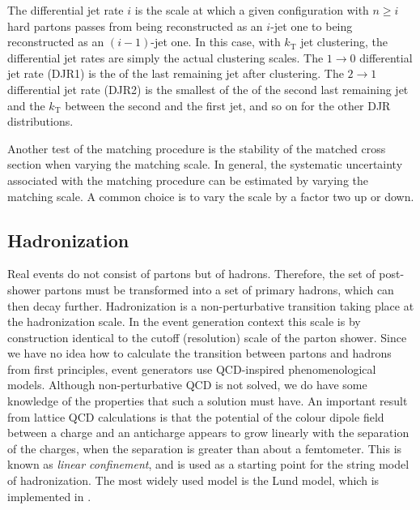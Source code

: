 The differential jet rate $i$ is the scale at which a given configuration with $n\geq i$ hard
partons passes from being reconstructed as an $i$-jet one to being reconstructed as an $(i − 1)$-jet
one. 
In this case, with $k_\mathrm{T}$ jet clustering, the differential jet rates are simply the actual
clustering scales. The $1\rightarrow 0$ differential jet rate (DJR1) is the \pt of the last
remaining jet after clustering. The $2\rightarrow 1$ differential jet rate (DJR2) is the smallest of
the \pt of the second last remaining jet and the $k_\mathrm{T}$ between the second and the first
jet, and so on for the other DJR distributions.

Another test of the matching procedure is the stability of the matched cross section when varying
the matching scale. In general, the systematic uncertainty associated with the matching procedure
can be estimated by varying the matching scale. A common choice is to vary the scale by a factor two
up or down. 


\subsection{Hadronization \label{sec:event_hadronization}}

Real events do not consist of partons but of hadrons. Therefore, the set of post-shower partons
must be transformed into a set of primary hadrons, which can then decay further. 
Hadronization is a non-perturbative transition taking place at the hadronization scale. In the
event generation context this scale is by construction identical to the cutoff (resolution) scale of
the parton shower.
Since we have no idea how to calculate the transition between partons and hadrons from first
principles, event generators use QCD-inspired phenomenological models.
Although non-perturbative QCD is not solved, we do have some knowledge of the properties
that such a solution must have. 
An important result from lattice QCD calculations is that the potential of the colour dipole field
between a charge and an anticharge appears to grow linearly with the separation of the charges, when
the separation is greater than about a femtometer. This is known as \textit{linear confinement}, and
is used as a starting point for the string model of hadronization.
The most widely used model is the Lund model, which is implemented in \PYTHIA.

